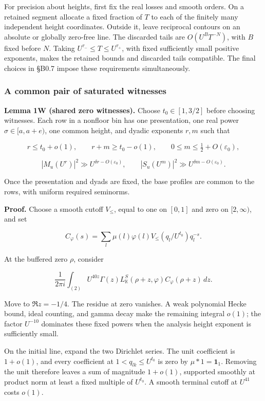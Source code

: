 \documentclass[11pt,a4paper]{article}
\begin{document}
For precision about heights, first fix the real losses and smooth
orders. On a retained segment allocate a fixed fraction of \(T\) to each
of the finitely many independent height coordinates. Outside it, leave
reciprocal contours on an absolute or globally zero-free line. The
discarded tails are \(O(U^BT^{-N})\), with \(B\) fixed before \(N\).
Taking \(U^{\tau_-}\le T\le U^{\tau_+}\), with fixed sufficiently small
positive exponents, makes the retained bounds and discarded tails
compatible. The final choices in §B0.7 impose these requirements
simultaneously.

\hypertarget{a-common-pair-of-saturated-witnesses}{%
\subsubsection{A common pair of saturated
witnesses}\label{a-common-pair-of-saturated-witnesses}}

\textbf{Lemma 1W (shared zero witnesses).} Choose \(t_0\in[1,\allowbreak{}3/2]\)
before choosing witnesses. Each row in a nonfloor bin has one
presentation, one real power \(\sigma\in[a,\allowbreak{}a+e)\), one common height,
and dyadic exponents \(r,\allowbreak{}m\) such that

\[
r\le t_0+o(1),\qquad r+m\ge t_0-o(1),\qquad
0\le m\le\tfrac12+O(\varepsilon_0),
\tag{B0.17}
\]

\[
|M_u(U^r)|^2\gg U^{\delta r-O(\varepsilon_0)},\qquad
|S_u(U^m)|^2\gg U^{\delta m-O(\varepsilon_0)}.
\tag{B0.18}
\]

Once the presentation and dyads are fixed, the base profiles are common
to the rows, with uniform required seminorms.

\textbf{Proof.} Choose a smooth cutoff \(V_\le\), equal to one on
\([0,\allowbreak{}1]\) and zero on \([2,\allowbreak{}\infty)\), and set

\[
C_\varphi(s)=\sum_l\mu(l)\varphi(l)V_\le(q_l/U^{t_0})q_l^{-s}.
\]

At the buffered zero \(\rho\), consider

\[
\frac1{2\pi i}\int_{(2)}U^{40z}\Gamma(z)
L_{\mathbb K}^S(\rho+z,\varphi)C_\varphi(\rho+z)\,dz.
\tag{B0.19}
\]

Move to \(\Re z=-1/4\). The residue at zero vanishes. A weak polynomial
Hecke bound, ideal counting, and gamma decay make the remaining integral
\(o(1)\); the factor \(U^{-10}\) dominates these fixed powers when the
analysis height exponent is sufficiently small.

On the initial line, expand the two Dirichlet series. The unit
coefficient is \(1+o(1)\), and every coefficient at
\(1<q_{lk}\le U^{t_0}\) is zero by \(\mu*1=\mathbf1_{1}\). Removing the
unit therefore leaves a sum of magnitude \(1+o(1)\), supported smoothly
at product norm at least a fixed multiple of \(U^{t_0}\). A smooth
terminal cutoff at \(U^{41}\) costs \(o(1)\).
\end{document}
